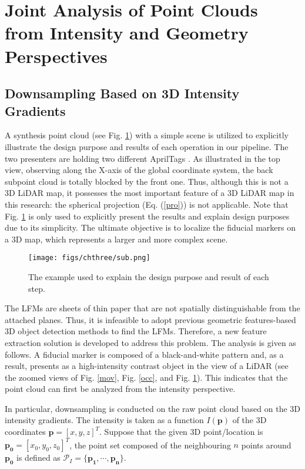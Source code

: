 \section{Joint Analysis of Point Clouds from Intensity and Geometry Perspectives} \label{4.2}
\subsection{Downsampling Based on 3D Intensity Gradients} \label{ic} 
A synthesis point cloud (see Fig. \ref{sub}) with a simple scene is utilized to explicitly illustrate the design purpose and results of each operation in our pipeline. The two presenters are holding two different AprilTags \cite{ap3}. As illustrated in the top view, observing along the X-axis of the global coordinate system, the back subpoint cloud is totally blocked by the front one. Thus, although this is not a 3D LiDAR map, it possesses the most important feature of a 3D LiDAR map in this research: the spherical projection (Eq. (\ref{pro})) is not applicable. Note that Fig. \ref{sub} is only used to explicitly present the results and explain design purposes due to its simplicity. The ultimate objective is to localize the fiducial markers on a 3D map, which represents a larger and more complex scene. 
\begin{figure}[ht] 
	\centering
\texttt{[image: figs/chthree/sub.png]}
	\caption{The example used to explain the design purpose and result of each step.}
	\label{sub}
\end{figure}\par
The LFMs are sheets of thin paper that are not spatially distinguishable from the attached planes. Thus, it is infeasible to adopt previous geometric features-based 3D object detection methods \cite{single, rangenet} to find the LFMs. Therefore, a new feature extraction solution is developed to address this problem. 
%
The analysis is given as follows. A fiducial marker is composed of a black-and-white pattern and, as a result, presents as a high-intensity contrast object in the view of a LiDAR (see the zoomed views of Fig. \ref{mov}, Fig. \ref{occ}, and Fig. \ref{sub}). This indicates that the point cloud can first be analyzed from the intensity perspective. \par
In particular, downsampling is conducted on the raw point cloud based on the 3D intensity gradients. The intensity is taken as a function $I(\mathbf{p})$ of the 3D coordinates $\mathbf{p} = [x,y,z]^{T}$. Suppose that the given 3D point/location is $\mathbf{{p}_{0}}=[x_{0},y_{0},z_{0}]^{T}$, the point set composed of the neighbouring $n$ points around $\mathbf{{p}_{0}}$ is defined as $\mathcal{P}_{I}=\{\mathbf{{p}_{1}},\cdots,\mathbf{{p}_{n}}\}$. 
